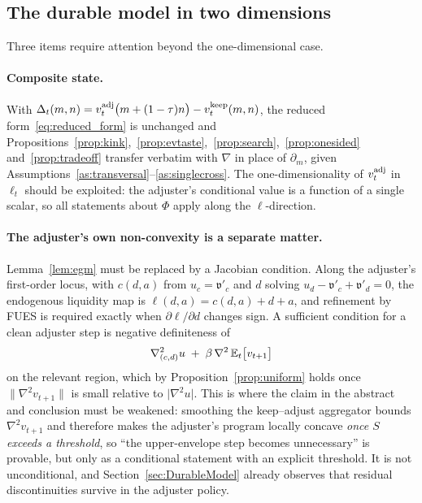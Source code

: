 \subsection{The durable model in two dimensions}
\label{subsec:smooth_durable}

Three items require attention beyond the one-dimensional case.

\paragraph{Composite state.}
With $\Delta_t(m,n)=v_t^{\mathrm{adj}}\big(m+(1-\tau)n\big)-v_t^{\mathrm{keep}}(m,n)$, the reduced
form~\eqref{eq:reduced_form} is unchanged and
Propositions~\ref{prop:kink},~\ref{prop:evtaste},~\ref{prop:search},~\ref{prop:onesided}
and~\ref{prop:tradeoff} transfer verbatim with $\nabla$ in place of $\partial_m$, given
Assumptions~\ref{as:transversal}--\ref{as:singlecross}. The one-dimensionality of
$v_t^{\mathrm{adj}}$ in $\ell_t$ should be exploited: the adjuster's conditional value is a
function of a single scalar, so all statements about $\Phi$ apply along the
$\ell$-direction.

\paragraph{The adjuster's own non-convexity is a separate matter.}
Lemma~\ref{lem:egm} must be replaced by a Jacobian condition. Along the adjuster's
first-order locus, with $c(d,a)$ from $u_c=\mathfrak{v}'_c$ and $d$ solving
$u_d-\mathfrak{v}'_c+\mathfrak{v}'_d=0$, the endogenous liquidity map is
$\ell(d,a)=c(d,a)+d+a$, and refinement by FUES is required exactly when
$\partial\ell/\partial d$ changes sign. A sufficient condition for a clean adjuster
step is negative definiteness of
\begin{align}
\nabla^{2}_{(c,d)}u \;+\; \beta\,\nabla^{2}\,\mathbb{E}_t\big[v_{t+1}\big]
\label{eq:adj_jacobian}
\end{align}
on the relevant region, which by Proposition~\ref{prop:uniform} holds once
$\|\nabla^{2}v_{t+1}\|$ is small relative to $\big|\nabla^{2}u\big|$. This is where the
claim in the abstract and conclusion must be weakened: smoothing the keep--adjust
aggregator bounds $\nabla^{2}v_{t+1}$ and therefore makes the adjuster's program
locally concave \emph{once $S$ exceeds a threshold}, so ``the upper-envelope step
becomes unnecessary'' is provable, but only as a conditional statement with an explicit
threshold. It is not unconditional, and Section~\ref{sec:DurableModel} already observes
that residual discontinuities survive in the adjuster policy.

